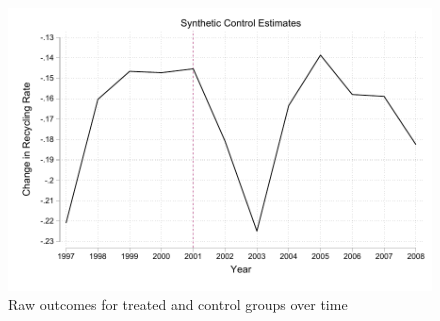 \documentclass{article}
\begin{document}
\begin{enumerate}
\begin{enumerate}
            \begin{figure}[ht]
            \centering
            \includegraphics[scale = 0.7]{Q5d_synth.pdf}
            \caption{Raw outcomes for treated and control groups over time}
            \label{fig:Q5d_synth}
            \end{figure}
            
       
        
        
    \end{enumerate}
    
\end{enumerate}
\end{document}
